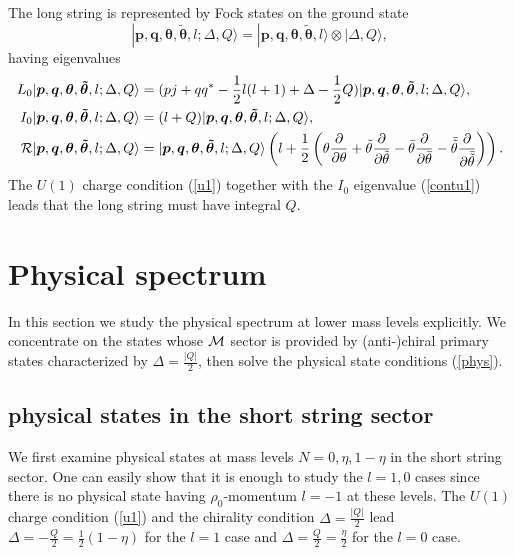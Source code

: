 \documentclass[a4paper,seceq,preprint]{ptptex}
\begin{document}
The long string is represented by Fock states on the ground state
\begin{equation}
 |\boldsymbol p,\boldsymbol q,
\boldsymbol\theta,\boldsymbol{\tilde\theta},l;\Delta,Q\rangle=
 |\boldsymbol p,\boldsymbol q,
\boldsymbol\theta,\boldsymbol{\tilde\theta},l\rangle
\otimes|\Delta,Q\rangle,
\end{equation}
having eigenvalues
\begin{align} 
 L_0|\boldsymbol p,\boldsymbol q,
\boldsymbol\theta,\boldsymbol{\tilde\theta},l;\Delta,Q\rangle&=
 (pj+qq^*-\frac{1}{2}l(l+1)+\Delta-\frac{1}{2}Q)
|\boldsymbol p,\boldsymbol q,
\boldsymbol\theta,\boldsymbol{\tilde\theta},l;\Delta,Q\rangle,\\
 I_0|\boldsymbol p,\boldsymbol q,
\boldsymbol\theta,\boldsymbol{\tilde\theta},l;\Delta,Q\rangle&=
 (l+Q)|\boldsymbol p,\boldsymbol q,
\boldsymbol\theta,\boldsymbol{\tilde\theta},l;\Delta,Q\rangle,
\label{contu1}\\
 {\cal R}|\boldsymbol p,\boldsymbol q,
\boldsymbol\theta,\boldsymbol{\tilde\theta},l;\Delta,Q\rangle&=
 |\boldsymbol p,\boldsymbol q,
\boldsymbol\theta,\boldsymbol{\tilde\theta},l;\Delta,Q\rangle
 \left(l+\frac{1}{2}\left(\theta\frac{\partial}{\partial\theta}
 +\tilde\theta\frac{\partial}{\partial\tilde\theta}
-\bar\theta\frac{\partial}{\partial\bar\theta}
-\bar{\tilde\theta}\frac{\partial}{\partial\bar{\tilde\theta}}\right)\right).
\label{utotlong}
\end{align}
The $U(1)$ charge condition (\ref{u1}) together with 
the $I_0$ eigenvalue (\ref{contu1}) leads that the long string
must have integral $Q$.

\section{Physical spectrum}\label{physspec}

In this section
we study the physical spectrum at lower mass levels explicitly.
We concentrate on the states whose ${\cal M}$ sector is 
provided by (anti-)chiral primary states characterized 
by $\Delta=\frac{|Q|}{2}$, then solve the physical state 
conditions (\ref{phys}).

\subsection{physical states in the short string sector}

We first examine physical states at mass levels 
$N=0,\eta,1-\eta$ in the short string sector.
One can easily show that it is enough to study the $l=1,0$ 
cases since there is no physical state having 
$\rho_0$-momentum $l=-1$ at these levels.
The $U(1)$ charge condition (\ref{u1}) and the chirality 
condition $\Delta=\frac{|Q|}{2}$ lead 
$\Delta=-\frac{Q}{2}=\frac{1}{2}(1-\eta)$ for the $l=1$ case
and $\Delta=\frac{Q}{2}=\frac{\eta}{2}$ for the $l=0$ case. 
\end{document}
